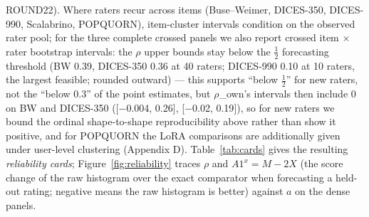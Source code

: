 \documentclass{article}
\begin{document}
ROUND22). Where raters recur across items (Buse--Weimer, DICES-350, DICES-990, Scalabrino, POPQUORN), item-cluster intervals condition on the observed rater pool; for the three complete crossed panels we also report crossed item $\times$ rater bootstrap intervals: the $\rho$ upper bounds stay below the $\tfrac12$ forecasting threshold (BW 0.39, DICES-350 0.36 at 40 raters; DICES-990 0.10 at 10 raters, the largest feasible; rounded outward) --- this supports ``below $\tfrac12$'' for new raters, not the ``below 0.3'' of the point estimates, but $\rho$\_own's intervals then include 0 on BW and DICES-350 ({[}$-$0.004, 0.26{]}, {[}$-$0.02, 0.19{]}), so for new raters we bound the ordinal shape-to-shape reproducibility above rather than show it positive, and for POPQUORN the LoRA comparisons are additionally given under user-level clustering (Appendix D). Table~\ref{tab:cards} gives the resulting \emph{reliability cards}; Figure~\ref{fig:reliability} traces \(\rho\) and \(A1^x = M-2X\) (the score change of the raw histogram over the exact comparator when forecasting a held-out rating; negative means the raw histogram is better) against \(a\) on the dense panels.
\end{document}
